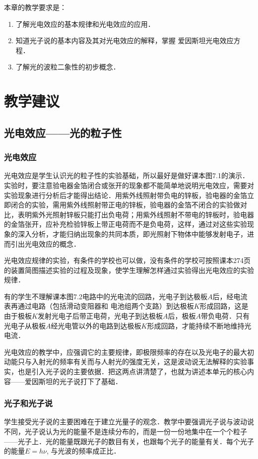 本章的教学要求是：
\begin{enumerate}
\item 了解光电效应的基本规律和光电效应的应用．
\item 知道光子说的基本内容及其对光电效应的解释，掌握
爱因斯坦光电效应方程．
\item 了解光的波粒二象性的初步概念．
\end{enumerate}


\section{教学建议}
\subsection{光电效应——光的粒子性}

\subsubsection{光电效应}

光电效应是学生认识光的粒子性的实验基础，所以最好是做好课本图7.1的演示．实验时，要注意验电器金箔闭合或张开的现象都不能简单地说明光电效应，需要对实验现象进行分析后才能得出结论．用紫外线照射带负电的锌板，验电器的金箔立即闭合的实验，需用紫外线照射带正电的锌板，验电器的金箔不闭合的实验做对比，表明紫外光照射锌板只能打出负电荷；用紫外线照射不带电的锌板时，验电器的金箔张开，应补充检验锌板上带正电荷而不是负电荷，这样，通过对这些实验现象的深入分析，才能归纳出现象的共同本质，即光照射下物体中能够发射电子，进而引出光电效应的概念．

光电效应规律的实验，有条件的学校也可以做，没有条件的学校可按照课本274页的装置简图描述实验的过程及现象，使学生理解怎样通过实验得出光电效应的实验规律．

有的学生不理解课本图7.2电路中的光电流的回路，光电子到达极板$A$后，经电流表再通过电路（包括滑动变阻器和
电池组两个支路）到达极板$K$形成回路，这是由于极板$K$发射光电子后带正电荷，光电子到达极板$A$后，极板$A$带负电荷．只有光电子从极板$A$经光电管以外的电路到达极板$K$形成回路，才能持续不断地维持光电流．

光电效应的教学中，应强调它的主要规律，即极限频率的存在以及光电子的最大初动能只与入射光的频率有关而与人射光的强度无关，这是波动说无法解释的实验事实，也是引入光子说的主要依据．把这两点讲清楚了，也就为讲述本单元的核心内容——爱因斯坦的光子说打下了基础．

\subsubsection{光子和光子说}
学生接受光子说的主要困难在于建立光量子的观念．教学中要强调光子说与波动说不同，光子说认为光的能量不是连续分布的，而是一份一份地集中在一个个粒子——光子上．光的能量既跟光子的数目有关，也跟每个光子的能量有关．每个光子的能量$E=h\nu$, 与光波的频率成正比．

